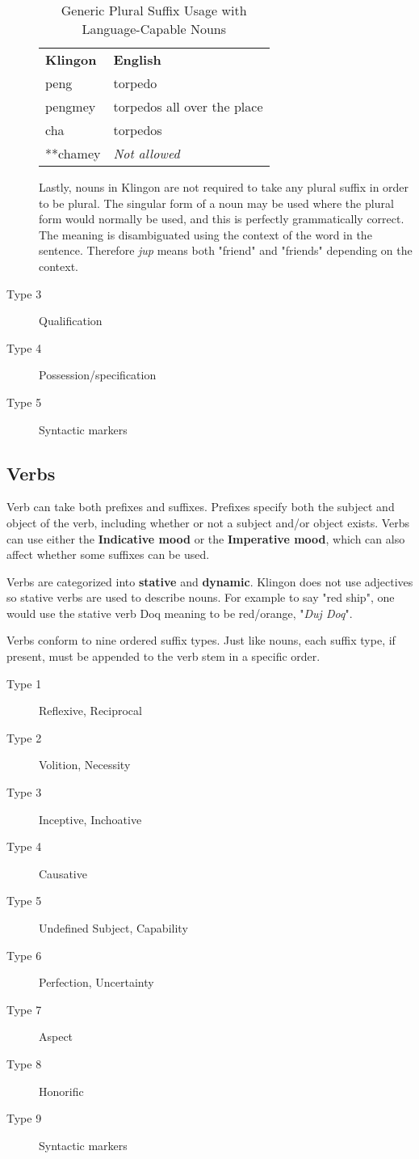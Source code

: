 \documentclass[11pt]{article}
\begin{document}
\begin{description}
	\begin{table}[h]
\begin{center}
\begin{tabular}{l|l}
\bf Klingon & \bf English \\
peng & torpedo \\
pengmey & torpedos all over the place \\
cha & torpedos \\
**chamey & \it Not allowed \\
\end{tabular}
\end{center}
\caption{Generic Plural Suffix Usage with Language-Capable Nouns}
\end{table}

	Lastly, nouns in Klingon are not required to take any plural suffix in order to be plural. The singular form of a noun may be used where the plural form would normally be used, and this is perfectly grammatically correct. The meaning is disambiguated using the context of the word in the sentence. Therefore \textit{jup} means both "friend" and "friends" depending on the context.

	\item[Type 3] Qualification
	\item[Type 4] Possession/specification
	\item[Type 5] Syntactic markers
\end{description}

\subsection {Verbs}

Verb can take both prefixes and suffixes. Prefixes specify both the subject and object of the verb, including whether or not a subject and/or object exists. Verbs can use either the \textbf{Indicative mood} or the \textbf{Imperative mood}, which can also affect whether some suffixes can be used.

Verbs are categorized into \textbf{stative} and \textbf{dynamic}. Klingon does not use adjectives so stative verbs are used to describe nouns. For example to say "red ship", one would use the stative verb Doq meaning to be red/orange, "\textit{Duj Doq}".

Verbs conform to nine ordered suffix types. Just like nouns, each suffix type, if present, must be appended to the verb stem in a specific order.

\begin{description}
	\item[Type 1] Reflexive, Reciprocal
	\item[Type 2] Volition, Necessity
	\item[Type 3] Inceptive, Inchoative
	\item[Type 4] Causative
	\item[Type 5] Undefined Subject, Capability
	\item[Type 6] Perfection, Uncertainty
	\item[Type 7] Aspect
	\item[Type 8] Honorific
	\item[Type 9] Syntactic markers
\end{description}
\end{document}
